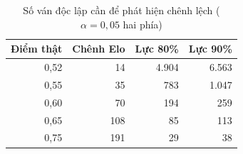 \begin{table}[H]
  \centering
  \small
  \caption{Số ván độc lập cần để phát hiện chênh lệch ($\alpha = 0{,}05$ hai phía)}
  \label{tab:cs-tk-luc}
  \begin{tabular}{rrrr}
    \toprule
    Điểm thật & Chênh Elo & Lực 80\% & Lực 90\% \\
    \midrule
    0,52 & 14 & 4.904 & 6.563 \\
    0,55 & 35 & 783 & 1.047 \\
    0,60 & 70 & 194 & 259 \\
    0,65 & 108 & 85 & 113 \\
    0,75 & 191 & 29 & 38 \\
    \bottomrule
  \end{tabular}
\end{table}
